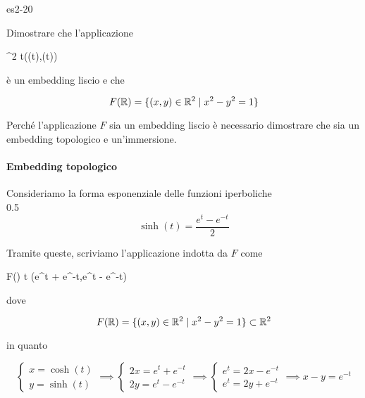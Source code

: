 {es2-20}
{
Dimostrare che l'applicazione

	{\R}{\R^{2}}
	{t}{(\cosh(t),\sinh(t))}

è un embedding liscio e che

\begin{equation}
	F(\mathbb{R}) = \{ (x,y) \in \mathbb{R}^{2} \mid x^{2}-y^{2} = 1 \}
\end{equation}
}
{
Perché l'applicazione $ F $ sia un embedding liscio è necessario dimostrare che sia un embedding topologico e un'immersione.

\paragraph{Embedding topologico}

Consideriamo la forma esponenziale delle funzioni iperboliche \\

	{0.5}{%
			\begin{equation}
				\sinh(t) = \dfrac{e^{t} - e^{-t}}{2}
			\end{equation}
			}

Tramite queste, scriviamo l'applicazione indotta da $ F $ come

	{\R}{F(\R)}
	{t}{ (e^{t} + e^{-t},e^{t} - e^{-t})}

dove

\begin{equation}
	F(\mathbb{R}) = \{ (x,y) \in \mathbb{R}^{2} \mid x^{2} - y^{2} = 1 \} \subset \mathbb{R}^{2}
\end{equation}

in quanto

\begin{equation}
	\begin{cases}
		x = \cosh(t) \\
		y = \sinh(t)
	\end{cases} %
	\implies %
	\begin{cases}
		2 x = e^{t} + e^{-t} \\
		2 y = e^{t} - e^{-t}
	\end{cases} %
	\implies %
	\begin{cases}
		e^{t} = 2 x - e^{-t} \\
		e^{t} = 2 y + e^{-t}
	\end{cases} %
	\implies %
	x - y = e^{-t}
\end{equation}

}
